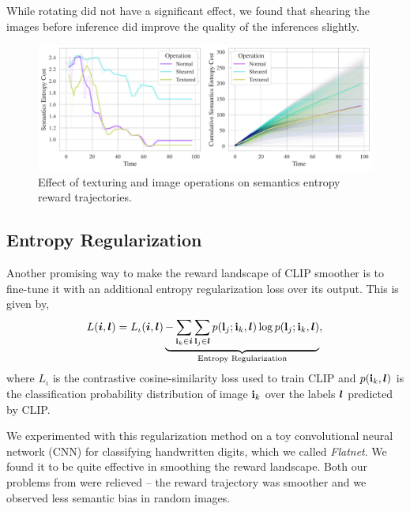 While rotating did not have a significant effect, we found that shearing the images before inference did improve the quality of the inferences slightly.

\begin{figure}[H]
    \centering
    \includegraphics[width=\textwidth]{images/texturing_operations_comparison.pdf}
    \caption{Effect of texturing and image operations on semantics entropy reward trajectories.}
    \label{fig:texturing-operations}
\end{figure}



\subsection{Entropy Regularization}
\label{sec:entropy-regularization}
Another promising way to make the reward landscape of CLIP smoother is to fine-tune it with an additional entropy regularization loss over its output.
This is given by,
\begin{equation}
    \label{eq:entropy-regularization}
    L(\bm{i}, \bm{l}) = L_{\iota}(\bm{i}, \bm{l}) \underbrace{- \sum_{\mathbf{i}_k \in \bm{i}}\sum_{\mathbf{l}_j \in \bm{l}} p(\mathbf{l}_j; \mathbf{i}_k, \bm{l}) \log p(\mathbf{l}_j; \mathbf{i}_k, \bm{l})}_{\text{Entropy Regularization}},\\
\end{equation}
where \(L_{\iota}\) is the contrastive cosine-similarity loss used to train CLIP and \(p(\mathbf{i}_k, \bm{l})\) is the classification probability distribution of image \(\mathbf{i}_k\) over the labels \(\bm{l}\) predicted by CLIP.

We experimented with this regularization method on a toy convolutional neural network (CNN) for classifying handwritten digits, which we called \emph{Flatnet}.
We found it to be quite effective in smoothing the reward landscape.
Both our problems from  were relieved -- the reward trajectory was smoother and we observed less semantic bias in random images.

